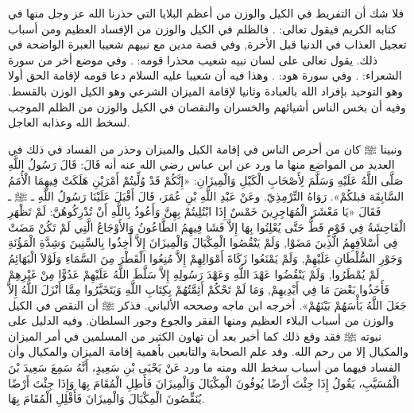 فلا شك أن التفريط في الكيل والوزن من أعظم البلايا التي حذرنا الله عز وجل منها في كتابه الكريم فيقول تعالى:
\quranayah*[83][1-6]{\footnotesize \surahname*[83]}. فالظلم في الكيل والوزن من الإفساد العظيم ومن أسباب تعجيل العذاب في الدنيا قبل الأخرة, وفي قصة مدين مع نبيهم شعيبا العبرة الواضحة في ذلك. يقول تعالى على لسان نبيه شعيب محذرا قومه:
\quranayah*[7][85]{\footnotesize \surahname*[7]}.
وفي موضع أخر من سورة الشعراء:
\quranayah*[26][181-183]{\footnotesize \surahname*[26]}.
وفي سورة هود:
\quranayah*[11][84-85]{\footnotesize \surahname*[11]}. وهذا فيه أن شعيبا عليه السلام دعا قومه لإقامة الحق أولا وهو التوحيد بإفراد الله بالعبادة وثانيا لإقامة الميزان الشرعي وهو الكيل الوزن بالقسط. وفيه أن بخس الناس أشيائهم والخسران والنقصان في الكيل والوزن من الظلم الموجب لسخط الله وعذابه العاجل.

ونبينا ﷺ كان من أحرص الناس في إقامة الكيل والميزان وحذر من الفساد في ذلك في العديد من المواضع منها ما ورد عن ابن عباس رضي الله عنه أنه قَالَ: قَالَ رَسُولُ اللَّهِ صَلَّى اللَّهُ عَلَيْهِ وَسَلَّمَ لِأَصْحَابِ الْكَيْلِ وَالْمِيزَانِ: «إِنَّكُمْ قَدْ وُلِّيتُمْ أَمْرَيْنِ هَلَكَتْ فِيهِمَا الْأُمَمُ السَّابِقَة قبلكُمْ».
{\footnotesize رَوَاهُ التِّرْمِذِيّ}.
وعَنْ عَبْدِ اللَّهِ بْنِ عُمَرَ، قَالَ أَقْبَلَ عَلَيْنَا رَسُولُ اللَّهِ ـ ﷺ ـ فَقَالَ «يَا مَعْشَرَ الْمُهَاجِرِينَ خَمْسٌ إِذَا ابْتُلِيتُمْ بِهِنَّ وَأَعُوذُ بِاللَّهِ أَنْ تُدْرِكُوهُنَّ: لَمْ تَظْهَرِ الْفَاحِشَةُ فِي قَوْمٍ قَطُّ حَتَّى يُعْلِنُوا بِهَا إِلاَّ فَشَا فِيهِمُ الطَّاعُونُ وَالأَوْجَاعُ الَّتِي لَمْ تَكُنْ مَضَتْ فِي أَسْلاَفِهِمُ الَّذِينَ مَضَوْا, وَلَمْ يَنْقُصُوا الْمِكْيَالَ وَالْمِيزَانَ إِلاَّ أُخِذُوا بِالسِّنِينَ وَشِدَّةِ الْمَؤُنَةِ وَجَوْرِ السُّلْطَانِ عَلَيْهِمْ, وَلَمْ يَمْنَعُوا زَكَاةَ أَمْوَالِهِمْ إِلاَّ مُنِعُوا الْقَطْرَ مِنَ السَّمَاءِ وَلَوْلاَ الْبَهَائِمُ لَمْ يُمْطَرُوا, وَلَمْ يَنْقُضُوا عَهْدَ اللَّهِ وَعَهْدَ رَسُولِهِ إِلاَّ سَلَّطَ اللَّهُ عَلَيْهِمْ عَدُوًّا مِنْ غَيْرِهِمْ فَأَخَذُوا بَعْضَ مَا فِي أَيْدِيهِمْ, وَمَا لَمْ تَحْكُمْ أَئِمَّتُهُمْ بِكِتَابِ اللَّهِ وَيَتَخَيَّرُوا مِمَّا أَنْزَلَ اللَّهُ إِلاَّ جَعَلَ اللَّهُ بَأْسَهُمْ بَيْنَهُمْ».
{\footnotesize أخرجه ابن ماجه وصححه الألباني}.
فذكر ﷺ أن النقص في الكيل والوزن من أسباب البلاء العظيم ومنها الفقر والجوع وجور السلطان. وفيه الدليل على نبوته ﷺ فقد وقع ذلك كما أخبر بعد أن تهاون الكثير من المسلمين في أمر الميزان والمكيال إلا من رحم الله. وقد علم الصحابة والتابعين بأهمية إقامة الميزان والمكيال وأن الفساد فيهما من أسباب سخط الله ومنه ما ورد عَنْ يَحْيَى بْنِ سَعِيدٍ، أَنَّهُ سَمِعَ سَعِيدَ بْنَ الْمُسَيَّبِ، يَقُولُ إِذَا جِئْتَ أَرْضًا يُوفُونَ الْمِكْيَالَ وَالْمِيزَانَ فَأَطِلِ الْمُقَامَ بِهَا وَإِذَا جِئْتَ أَرْضًا يُنَقِّصُونَ الْمِكْيَالَ وَالْمِيزَانَ فَأَقْلِلِ الْمُقَامَ بِهَا.


